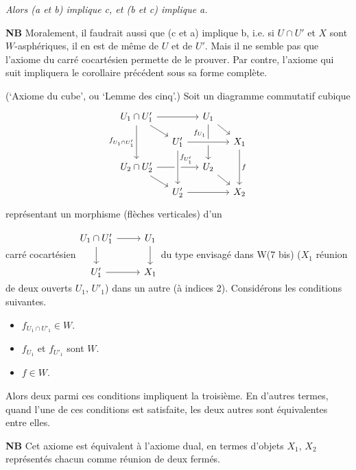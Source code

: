 \documentclass[11pt]{article}
\newcommand{\printedpage}[1]{\marginpar{\footnotesize p.~#1}}
\newcommand{\msp}[1]{\marginpar{\footnotesize [#1]}}
\begin{document}
\textit{Alors (a et b) implique c, et (b et c) implique a.}

\textbf{NB} Moralement, il faudrait aussi que (c et a) implique b, i.e. si $U\cap U'$ et $X$ sont $W$-asphériques, il en est de même de $U$ et de $U'$. Mais il ne semble pas que l'axiome du carré cocartésien permette de le prouver. Par contre, l'axiome qui suit impliquera le corollaire précédent sous sa forme complète.

\printedpage{56}

\begin{description}[leftmargin=5em, style=sameline]
\item[W(7)] (`Axiome du cube', ou `Lemme des cinq'.) Soit un diagramme commutatif cubique
\[
\begin{tikzcd}[row sep=small, column sep=small]
U_1\cap U'_1 \arrow[rr] \arrow[dr] \arrow[dd, "f_{U_1\cap U'_1}"'] & & U_1 \arrow[dr] \arrow[dd, "f_{U_1}"{swap,pos=.25}] & \\
& U'_1 \arrow[rr, crossing over] & & X_1 \arrow[dd, "f"] \\
U_2\cap U'_2 \arrow[rr] \arrow[dr] & & U_2 \arrow[dr] & \\
& U'_2 \arrow[rr] \arrow[from=uu, crossing over, "f_{U'_1}"{pos=.25}] & & X_2
\end{tikzcd}
\]
représentant un morphisme (flèches verticales) d'un

\msp{page 77}
carré cocartésien\quad $\vcenter{\hbox{\begin{tikzcd}
U_1\cap U'_1 \arrow[r] \arrow[d] & U_1 \arrow[d] \\
U'_1 \arrow[r] & X_1
\end{tikzcd}}}$\quad du type envisagé dans W(7 bis) ($X_1$ réunion de deux ouverts $U_1$, $U'_1$) dans un autre (à indices 2). Considérons les conditions suivantes.

\begin{itemize}
\item[a)] $f_{U_1\cap U'_1}\in W$.
\item[b)] $f_{U_1}$ et $f_{U'_1}$ sont $W$.
\item[c)] $f\in W$.
\end{itemize}

Alors deux parmi ces conditions impliquent la troisième. En d'autres termes, quand l'une de ces conditions est satisfaite, les deux autres sont équivalentes entre elles.
\end{description}

\textbf{NB} Cet axiome est équivalent à l'axiome dual, en termes d'objets $X_1$, $X_2$ représentés chacun comme réunion de deux fermés.
\end{document}
